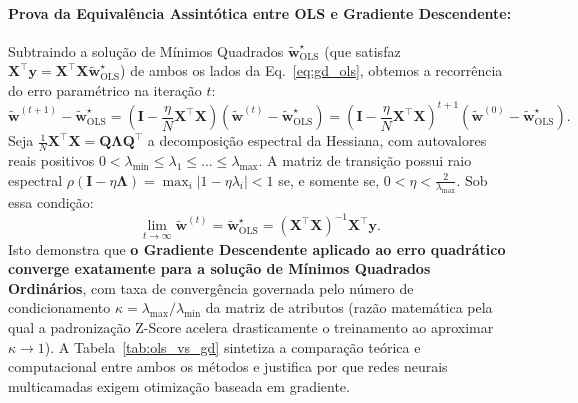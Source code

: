 ﻿\documentclass[runningheads]{llncs}
\begin{document}
\paragraph{Prova da Equival\^{e}ncia Assint\'{o}tica entre OLS e Gradiente Descendente:}
Subtraindo a solu\c{c}\~{a}o de M\'{i}nimos Quadrados $\tilde{\mathbf{w}}^\star_{\text{OLS}}$ (que satisfaz $\mathbf{X}^\top \mathbf{y} = \mathbf{X}^\top \mathbf{X}\tilde{\mathbf{w}}^\star_{\text{OLS}}$) de ambos os lados da Eq.~\eqref{eq:gd_ols}, obtemos a recorr\^{e}ncia do erro param\'{e}trico na itera\c{c}\~{a}o $t$:
\begin{equation}
    \tilde{\mathbf{w}}^{(t+1)} - \tilde{\mathbf{w}}^\star_{\text{OLS}} = \left(\mathbf{I} - \frac{\eta}{N}\mathbf{X}^\top \mathbf{X}\right)\!\left(\tilde{\mathbf{w}}^{(t)} - \tilde{\mathbf{w}}^\star_{\text{OLS}}\right) = \left(\mathbf{I} - \frac{\eta}{N}\mathbf{X}^\top \mathbf{X}\right)^{t+1}\!\left(\tilde{\mathbf{w}}^{(0)} - \tilde{\mathbf{w}}^\star_{\text{OLS}}\right).
    \label{eq:ols_gd_bridge}
\end{equation}
Seja $\frac{1}{N}\mathbf{X}^\top \mathbf{X} = \mathbf{Q}\boldsymbol{\Lambda}\mathbf{Q}^\top$ a decomposi\c{c}\~{a}o espectral da Hessiana, com autovalores reais positivos $0 < \lambda_{\min} \le \lambda_1 \le \dots \le \lambda_{\max}$. A matriz de transi\c{c}\~{a}o possui raio espectral $\rho(\mathbf{I} - \eta \boldsymbol{\Lambda}) = \max_i |1 - \eta \lambda_i| < 1$ se, e somente se, $0 < \eta < \frac{2}{\lambda_{\max}}$. Sob essa condi\c{c}\~{a}o:
\begin{equation}
    \lim_{t \to \infty} \tilde{\mathbf{w}}^{(t)} = \tilde{\mathbf{w}}^\star_{\text{OLS}} = (\mathbf{X}^\top \mathbf{X})^{-1}\mathbf{X}^\top \mathbf{y}.
\end{equation}
Isto demonstra que \textbf{o Gradiente Descendente aplicado ao erro quadr\'{a}tico converge exatamente para a solu\c{c}\~{a}o de M\'{i}nimos Quadrados Ordin\'{a}rios}, com taxa de converg\^{e}ncia governada pelo n\'{u}mero de condicionamento $\kappa = \lambda_{\max}/\lambda_{\min}$ da matriz de atributos (raz\~{a}o matem\'{a}tica pela qual a padroniza\c{c}\~{a}o Z-Score acelera drasticamente o treinamento ao aproximar $\kappa \to 1$). A Tabela~\ref{tab:ols_vs_gd} sintetiza a compara\c{c}\~{a}o te\'{o}rica e computacional entre ambos os m\'{e}todos e justifica por que redes neurais multicamadas exigem otimiza\c{c}\~{a}o baseada em gradiente.
\end{document}
